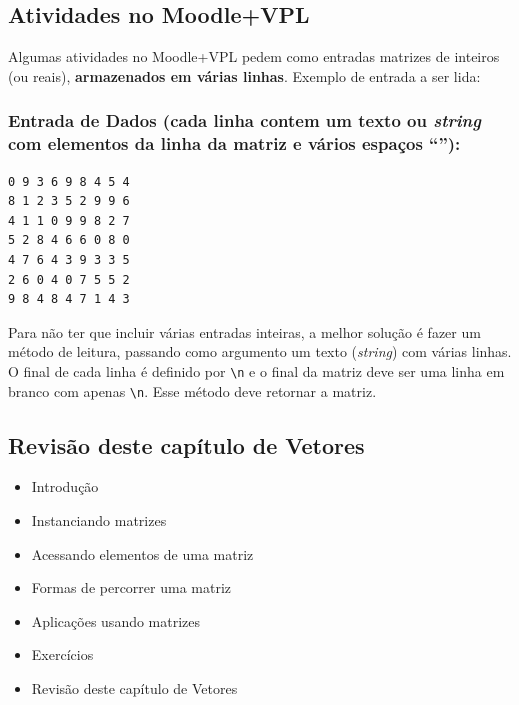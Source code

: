\documentclass[12pt,a4paper]{article}
\providecommand{\tightlist}{%
      \setlength{\itemsep}{0pt}\setlength{\parskip}{0pt}}
\begin{document}
    \hypertarget{atividades-no-moodlevpl}{%
\subsection{Atividades no Moodle+VPL}\label{atividades-no-moodlevpl}}

Algumas atividades no Moodle+VPL pedem como entradas matrizes de
inteiros (ou reais), \textbf{armazenados em várias linhas}. Exemplo de
entrada a ser lida:

\hypertarget{entrada-de-dados-cada-linha-contem-um-texto-ou-string-com-elementos-da-linha-da-matriz-e-vuxe1rios-espauxe7os}{%
\subsubsection{\texorpdfstring{Entrada de Dados (cada linha contem um
texto ou \emph{string} com elementos da linha da matriz e vários espaços
``\texttt{}''):}{Entrada de Dados (cada linha contem um texto ou string com elementos da linha da matriz e vários espaços ``\,''):}}\label{entrada-de-dados-cada-linha-contem-um-texto-ou-string-com-elementos-da-linha-da-matriz-e-vuxe1rios-espauxe7os}}

\begin{verbatim}
0 9 3 6 9 8 4 5 4
8 1 2 3 5 2 9 9 6
4 1 1 0 9 9 8 2 7
5 2 8 4 6 6 0 8 0
4 7 6 4 3 9 3 3 5
2 6 0 4 0 7 5 5 2
9 8 4 8 4 7 1 4 3
\end{verbatim}

Para não ter que incluir várias entradas inteiras, a melhor solução é
fazer um método de leitura, passando como argumento um texto
(\emph{string}) com várias linhas. O final de cada linha é definido por
\texttt{\textbackslash{}n} e o final da matriz deve ser uma linha em
branco com apenas \texttt{\textbackslash{}n}. Esse método deve retornar
a matriz.

    \hypertarget{revisuxe3o-deste-capuxedtulo-de-vetores}{%
\subsection{Revisão deste capítulo de
Vetores}\label{revisuxe3o-deste-capuxedtulo-de-vetores}}

\begin{itemize}
\tightlist
\item
  Introdução
\item
  Instanciando matrizes
\item
  Acessando elementos de uma matriz
\item
  Formas de percorrer uma matriz
\item
  Aplicações usando matrizes
\item
  Exercícios
\item
  Revisão deste capítulo de Vetores
\end{itemize}
\end{document}
